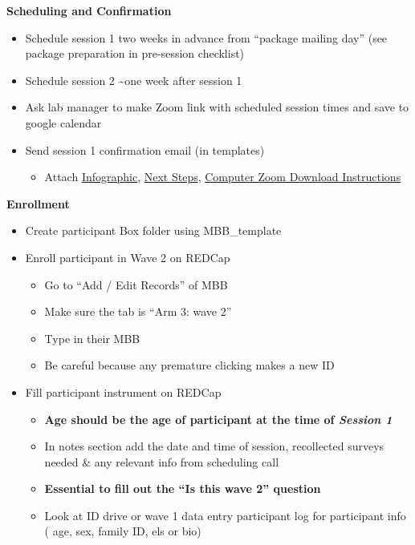 \documentclass[]{book}
\providecommand{\tightlist}{%
  \setlength{\itemsep}{0pt}\setlength{\parskip}{0pt}}
\begin{document}
\textbf{Scheduling and Confirmation}

\begin{itemize}
\item
  Schedule session 1 two weeks in advance from ``package mailing day'' (see package preparation in pre-session checklist)
\item
  Schedule session 2 \textasciitilde{}one week after session 1
\item
  Ask lab manager to make Zoom link with scheduled session times and save to google calendar
\item
  Send session 1 confirmation email (in templates)

  \begin{itemize}
  \tightlist
  \item
    Attach \href{https://app.box.com/file/776654994352}{Infographic}, \href{https://app.box.com/file/774936561660}{Next Steps}, \href{https://ucla.app.box.com/file/680632734387}{Computer Zoom Download Instructions}
  \end{itemize}
\end{itemize}

\textbf{Enrollment}

\begin{itemize}
\tightlist
\item
  Create participant Box folder using MBB\_template\\
\item
  Enroll participant in Wave 2 on REDCap

  \begin{itemize}
  \tightlist
  \item
    Go to ``Add / Edit Records'' of MBB
  \item
    Make sure the tab is ``Arm 3: wave 2''
  \item
    Type in their MBB
  \item
    Be careful because any premature clicking makes a new ID
  \end{itemize}
\item
  Fill participant instrument on REDCap

  \begin{itemize}
  \tightlist
  \item
    \textbf{Age should be the age of participant at the time of \emph{Session 1} }
  \item
    In notes section add the date and time of session, recollected surveys needed \& any relevant info from scheduling call\\
  \item
    \textbf{Essential to fill out the ``Is this wave 2'' question}
  \item
    Look at ID drive or wave 1 data entry participant log for participant info ( age, sex, family ID, els or bio)
  \end{itemize}
\end{itemize}
\end{document}
